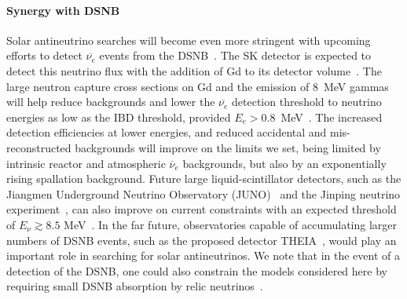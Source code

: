 \documentclass[
reprint,
superscriptaddress,
showpacs,
preprintnumbers,
nofootinbib,
nobibnotes,
amsmath,
amssymb, 
aps,
prd,
floatfix
]{revtex4-1}
\begin{document}
\paragraph{Synergy with DSNB} Solar antineutrino searches will become even more stringent with upcoming efforts to detect $\overline{\nu_e}$ events from the DSNB~\cite{Horiuchi:2008jz,Lunardini:2009ya}. The SK detector is expected to detect this neutrino flux with the addition of Gd to its detector volume~\cite{Beacom:2003nk}. The large neutron capture cross sections on Gd and the emission of $8$~MeV gammas will help reduce backgrounds and lower the $\overline{\nu_e}$ detection threshold to neutrino energies as low as the IBD threshold, provided $E_e > 0.8$~MeV~\cite{Simpson:2019xwo}. The increased detection efficiencies at lower energies, and reduced accidental and mis-reconstructed backgrounds will improve on the limits we set, being limited by intrinsic reactor and atmospheric $\overline{\nu}_e$ backgrounds, but also by an exponentially rising spallation background. Future large liquid-scintillator detectors, such as the Jiangmen Underground Neutrino Observatory (JUNO)~\cite{An:2015jdp}
and the Jinping neutrino experiment~\cite{JinpingNeutrinoExperimentgroup:2016nol}, can also improve on current constraints with an expected threshold of $E_\nu \gtrsim 8.5$ MeV~\cite{Li:2019snw}.  In the far future, observatories capable of accumulating larger numbers of DSNB events, such as the proposed detector THEIA~\cite{Askins:2019oqj}, would play an important role in searching for solar antineutrinos. We note that in the event of a detection of the DSNB, one could also constrain the models considered here by requiring small DSNB absorption by relic neutrinos~\cite{Jeong:2018yts,Bustamante:2020mep}. 
\end{document}
